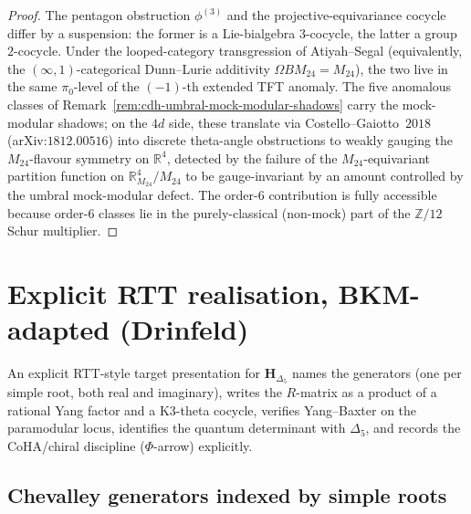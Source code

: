 \begin{proof}
The pentagon obstruction $\phi^{(3)}$ and the projective-equivariance cocycle
differ by a suspension: the former is a Lie-bialgebra $3$-cocycle, the latter a
group $2$-cocycle. Under the looped-category transgression of Atiyah--Segal
(equivalently, the $(\infty,1)$-categorical Dunn--Lurie additivity
$\Omega B M_{24} = M_{24}$), the two live in the same $\pi_0$-level of the $(-1)$-th
extended TFT anomaly. The five anomalous classes of
Remark~\ref{rem:cdh-umbral-mock-modular-shadows} carry the mock-modular shadows; on
the $4d$ side, these translate via Costello--Gaiotto~$2018$ (arXiv:$1812.00516$)
into discrete theta-angle obstructions to weakly gauging the $M_{24}$-flavour
symmetry on $\mathbb{R}^4$, detected by the failure of the $M_{24}$-equivariant
partition function on $\mathbb{R}^4_{M_{24}}/M_{24}$ to be gauge-invariant by an
amount controlled by the umbral mock-modular defect. The order-$6$ contribution
is fully accessible because order-$6$ classes lie in the purely-classical (non-mock)
part of the $\mathbb{Z}/12$ Schur multiplier.
\end{proof}

\section{Explicit RTT realisation, BKM-adapted (Drinfeld)}
\label{sec:kcb-drinfeld-explicit-rtt}

An explicit RTT-style target
presentation for $\mathbf{H}_{\Delta_5}$ names the generators (one per
simple root, both real and imaginary), writes the $R$-matrix as a product of
a rational Yang factor and a K3-theta cocycle, verifies Yang--Baxter on the
paramodular locus, identifies the quantum determinant with $\Delta_5$, and
records the CoHA/chiral discipline ($\Phi$-arrow) explicitly.

\subsection{Chevalley generators indexed by simple roots}
\label{subsec:kcb-rtt-generators}

